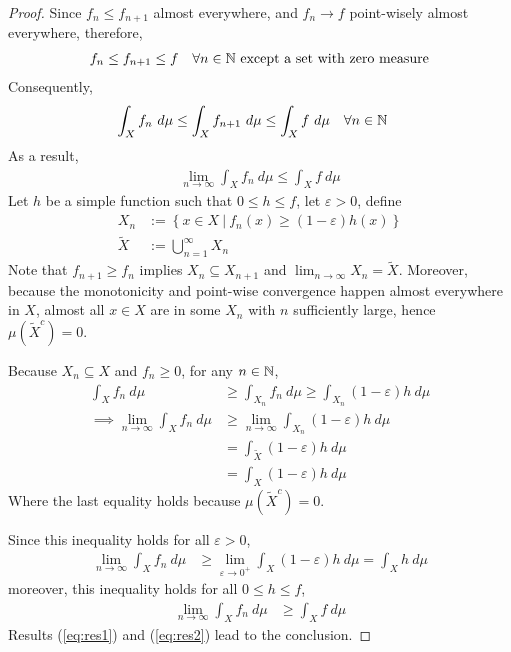 \documentclass[11pt]{article}
\begin{document}
	\begin{proof}
		Since $f_{n} \leq f_{n+1}$ almost everywhere, and $f_n \to f$ point-wisely almost everywhere, therefore,
		\begin{align}
			f_n \leq f_{n+1} \leq f\quad \forall n \in \mathbb{N} \text{{ except a set with zero measure}}
		\end{align}
		Consequently,
		\begin{align}
			\int_X f_n\ d\mu &\leq \int_X f_{n+1}\ d\mu\leq \int_X f\ d\mu\quad \forall n \in \mathbb{N}
		\end{align}
		As a result,
		\begin{align}
			\lim_{n \to \infty} \int_X f_n\ d\mu \leq \int_X f\ d\mu \label{eq:res1}
		\end{align}
		Let $h$ be a simple function such that $0 \leq h \leq f$, let $\varepsilon > 0$, define
		\begin{align}
			X_n &:= \left\{x \in X\ |\ f_n(x) \geq (1 - \varepsilon) h(x) \right\} \\
			\tilde{X} &:= \bigcup_{n=1}^\infty X_n
		\end{align}
		Note that $f_{n+1} \geq f_n$ implies $X_{n} \subseteq X_{n+1}$ and $\lim_{n\to \infty} X_n = \tilde{X}$.
		Moreover, because the monotonicity and point-wise convergence happen almost everywhere in $X$, 
		almost all $x \in X$ are in some $X_n$ with $n$ sufficiently large, hence $\mu(\tilde{X}^c) = 0$.
		
		Because $X_n \subseteq X$ and $f_n \geq 0$, for any $n \in \mathbb{N}$,
		\begin{align}
			\int_X f_n\ d\mu &\geq \int_{X_n}f_n\ d\mu \geq \int_{X_n} (1 - \varepsilon) h\ d\mu \\
			\implies \lim_{n \to \infty} \int_X f_n\ d\mu &\geq \lim_{n \to \infty} \int_{X_n} (1 - \varepsilon) h\ d\mu \\
			&= \int_{\tilde{X}} (1 - \varepsilon) h\ d\mu \\
			&= \int_{X} (1 - \varepsilon) h\ d\mu
		\end{align}
		Where the last equality holds because $\mu(\tilde{X}^c) = 0$.
		
		Since this inequality holds for all $\varepsilon > 0$,
		\begin{align}
			\lim_{n \to \infty} \int_X f_n\ d\mu &\geq \lim_{\varepsilon \to 0^+} \int_{X} (1 - \varepsilon) h\ d\mu = \int_X h\ d\mu
		\end{align}
		moreover, this inequality holds for all $0 \leq h \leq f$,
		\begin{align}
			\lim_{n \to \infty} \int_X f_n\ d\mu &\geq \int_{X} f\ d\mu \label{eq:res2}
		\end{align}
		Results (\ref{eq:res1}) and (\ref{eq:res2}) lead to the conclusion.
	\end{proof}
	
\end{document}
